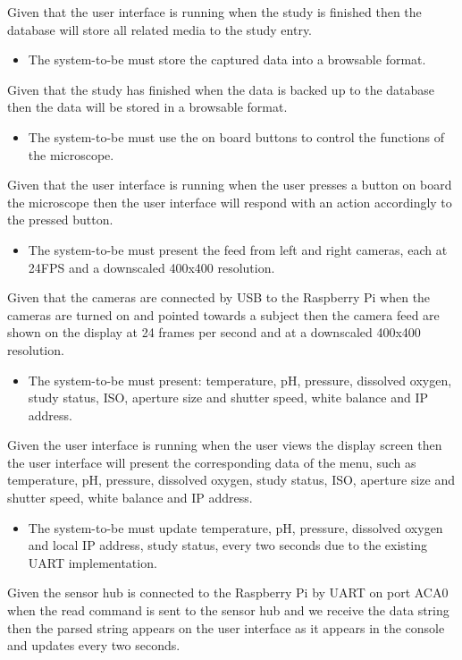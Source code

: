 Given that the user interface is running when the study is finished then the database will store all related media to the study entry.
\begin{itemize}
	\item The system-to-be must store the captured data into a browsable format.
\end{itemize}
Given that the study has finished when the data is backed up to the database then the data will be stored in a browsable format.
\begin{itemize}
	\item The system-to-be must use the on board buttons to control the functions of the microscope.
\end{itemize}
Given that the user interface is running when the user presses a button on board the microscope then the user interface will respond with an action accordingly to the pressed button.
\begin{itemize}
	\item The system-to-be must present the feed from left and right cameras, each at 24FPS and a downscaled 400x400 resolution.
\end{itemize}
Given that the cameras are connected by USB to the Raspberry Pi when the cameras are turned on and pointed towards a subject then the camera feed are shown on the display at 24 frames per second and at a downscaled 400x400 resolution.
\begin{itemize}
	\item The system-to-be must present: temperature, pH, pressure, dissolved oxygen, study status, ISO, aperture size and shutter speed, white balance and IP address.
\end{itemize}
Given the user interface is running when the user views the display screen then the user interface will present the corresponding data of the menu, such as temperature, pH, pressure, dissolved oxygen, study status, ISO, aperture size and shutter speed, white balance and IP address.
\begin{itemize}
	\item The system-to-be must update temperature, pH, pressure, dissolved oxygen and local IP address, study status, every two seconds due to the existing UART implementation.
\end{itemize}
Given the sensor hub is connected to the Raspberry Pi by UART on port ACA0 when the read command is sent to the sensor hub and we receive the data string then the parsed string appears on the user interface as it appears in the console and updates every two seconds.
